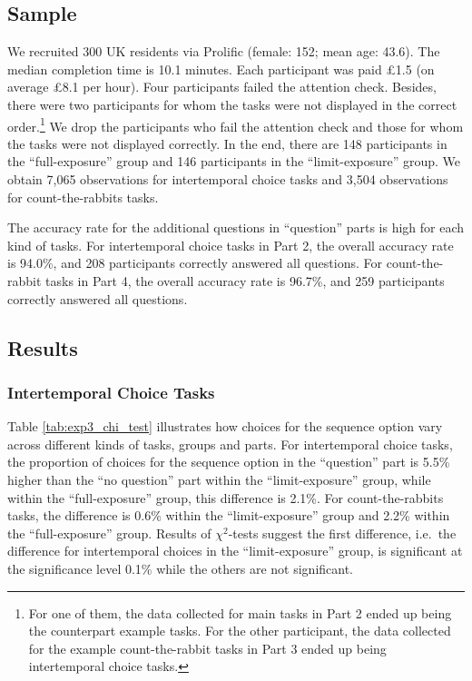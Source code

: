 \documentclass[
  12pt,
]{article}
\begin{document}
\hypertarget{sample}{%
\subsection{Sample}\label{sample}}

We recruited 300 UK residents via Prolific (female: 152; mean age:
43.6). The median completion time is 10.1 minutes. Each participant was
paid £1.5 (on average £8.1 per hour). Four participants failed the
attention check. Besides, there were two participants for whom the tasks
were not displayed in the correct order.\footnote{For one of them, the
  data collected for main tasks in Part 2 ended up being the counterpart
  example tasks. For the other participant, the data collected for the
  example count-the-rabbit tasks in Part 3 ended up being intertemporal
  choice tasks.} We drop the participants who fail the attention check
and those for whom the tasks were not displayed correctly. In the end,
there are 148 participants in the ``full-exposure'' group and 146
participants in the ``limit-exposure'' group. We obtain 7,065
observations for intertemporal choice tasks and 3,504 observations for
count-the-rabbits tasks.

The accuracy rate for the additional questions in ``question'' parts is
high for each kind of tasks. For intertemporal choice tasks in Part 2,
the overall accuracy rate is 94.0\%, and 208 participants correctly
answered all questions. For count-the-rabbit tasks in Part 4, the
overall accuracy rate is 96.7\%, and 259 participants correctly answered
all questions.

\hypertarget{results}{%
\subsection{Results}\label{results}}

\hypertarget{intertemporal-choice-tasks}{%
\subsubsection{\texorpdfstring{Intertemporal Choice Tasks
\label{exp3_intertemporal_result}}{Intertemporal Choice Tasks }}\label{intertemporal-choice-tasks}}

Table \ref{tab:exp3_chi_test} illustrates how choices for the sequence
option vary across different kinds of tasks, groups and parts. For
intertemporal choice tasks, the proportion of choices for the sequence
option in the ``question'' part is 5.5\% higher than the ``no question''
part within the ``limit-exposure'' group, while within the
``full-exposure'' group, this difference is 2.1\%. For count-the-rabbits
tasks, the difference is 0.6\% within the ``limit-exposure'' group and
2.2\% within the ``full-exposure'' group. Results of \(\chi^2\)-tests
suggest the first difference, i.e.~the difference for intertemporal
choices in the ``limit-exposure'' group, is significant at the
significance level 0.1\% while the others are not significant.
\end{document}
